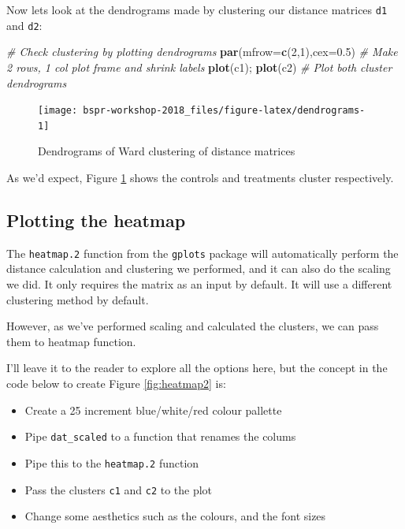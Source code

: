 \documentclass[12pt,]{book}
\newenvironment{Shaded}{\begin{snugshade}}{\end{snugshade}}
\newcommand{\KeywordTok}[1]{\textcolor[rgb]{0.13,0.29,0.53}{\textbf{#1}}}
\newcommand{\DataTypeTok}[1]{\textcolor[rgb]{0.13,0.29,0.53}{#1}}
\newcommand{\DecValTok}[1]{\textcolor[rgb]{0.00,0.00,0.81}{#1}}
\newcommand{\FloatTok}[1]{\textcolor[rgb]{0.00,0.00,0.81}{#1}}
\newcommand{\CommentTok}[1]{\textcolor[rgb]{0.56,0.35,0.01}{\textit{#1}}}
\newcommand{\NormalTok}[1]{#1}
\providecommand{\tightlist}{%
  \setlength{\itemsep}{0pt}\setlength{\parskip}{0pt}}
\theoremstyle{definition}
\theoremstyle{definition}
\theoremstyle{definition}
\theoremstyle{remark}
\begin{document}
Now lets look at the dendrograms made by clustering our distance
matrices \texttt{d1} and \texttt{d2}:



\begin{Shaded}
\begin{Highlighting}[]
\CommentTok{# Check clustering by plotting dendrograms}
\KeywordTok{par}\NormalTok{(}\DataTypeTok{mfrow=}\KeywordTok{c}\NormalTok{(}\DecValTok{2}\NormalTok{,}\DecValTok{1}\NormalTok{),}\DataTypeTok{cex=}\FloatTok{0.5}\NormalTok{) }\CommentTok{# Make 2 rows, 1 col plot frame and shrink labels}
\KeywordTok{plot}\NormalTok{(c1); }\KeywordTok{plot}\NormalTok{(c2) }\CommentTok{# Plot both cluster dendrograms}
\end{Highlighting}
\end{Shaded}

\begin{figure}

{\centering \texttt{[image: bspr-workshop-2018\_files/figure-latex/dendrograms-1]} 

}

\caption{Dendrograms of Ward clustering of distance matrices}\label{fig:dendrograms}
\end{figure}

As we'd expect, Figure \ref{fig:dendrograms} shows the controls and
treatments cluster respectively.

\subsection{Plotting the heatmap}\label{plotting-the-heatmap}

The \texttt{heatmap.2} function from the \texttt{gplots} package will
automatically perform the distance calculation and clustering we
performed, and it can also do the scaling we did. It only requires the
matrix as an input by default. It will use a different clustering method
by default.

However, as we've performed scaling and calculated the clusters, we can
pass them to heatmap function.

I'll leave it to the reader to explore all the options here, but the
concept in the code below to create Figure \ref{fig:heatmap2} is:

\begin{itemize}
\tightlist
\item
  Create a 25 increment blue/white/red colour pallette
\item
  Pipe \texttt{dat\_scaled} to a function that renames the colums
\item
  Pipe this to the \texttt{heatmap.2} function
\item
  Pass the clusters \texttt{c1} and \texttt{c2} to the plot
\item
  Change some aesthetics such as the colours, and the font sizes
\end{itemize}
\end{document}
